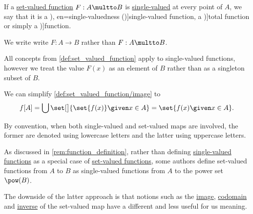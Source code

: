 \begin{definition}\label{def:function}
  If a \hyperref[def:set_valued_function]{set-valued function} \( F: A \multto B \) is \hyperref[def:set_valued_function/value_cardinality/single]{single-valued} at every point of \( A \), we say that it is a \term[ru=однозначная функция (\cite[12]{Курош1973ОбщаяАлгебра}), en=single-valuedness (\cite[5]{Jacobson1985BasicAlgebraI})]{single-valued function}, a \term[en=total function (\cite[def. 2.3.13]{Rosen2019DiscreteMathematics})]{total function} or simply a \term[ru=функция (\cite[\S 1.2.4]{КусраевКутателадзе2005БулевозначныйАнализ})]{function}.

  We write write \( F: A \to B \) rather than \( F: A \multto B \).

  All concepts from \cref{def:set_valued_function} apply to single-valued functions, however we treat the value \( F(x) \) as an element of \( B \) rather than as a singleton subset of \( B \).
\end{definition}
\begin{comments}
  \item We can simplify \cref{def:set_valued_function/image} to
  \begin{equation*}
    f[A]
    =
    \bigcup \set[\big]{ \set{ f(x) } \given x \in A }
    =
    \set{ f(x) \given x \in A }.
  \end{equation*}

  \item By convention, when both single-valued and set-valued maps are involved, the former are denoted using lowercase letters and the latter using uppercase letters.
\end{comments}

\begin{remark}\label{rem:set_valued_map_as_single_valued}
  As discussed in \cref{rem:function_definition}, rather than defining \hyperref[def:function]{single-valued functions} as a special case of \hyperref[def:set_valued_function]{set-valued functions}, some authors define set-valued functions from \( A \) to \( B \) as single-valued functions from \( A \) to the power set \( \pow(B) \).

  The downside of the latter approach is that notions such as the \hyperref[def:set_valued_function/image]{image}, \hyperref[def:set_valued_function/codomain]{codomain} and \hyperref[def:set_valued_function/inverse]{inverse} of the set-valued map have a different and less useful for us meaning.
\end{remark}

